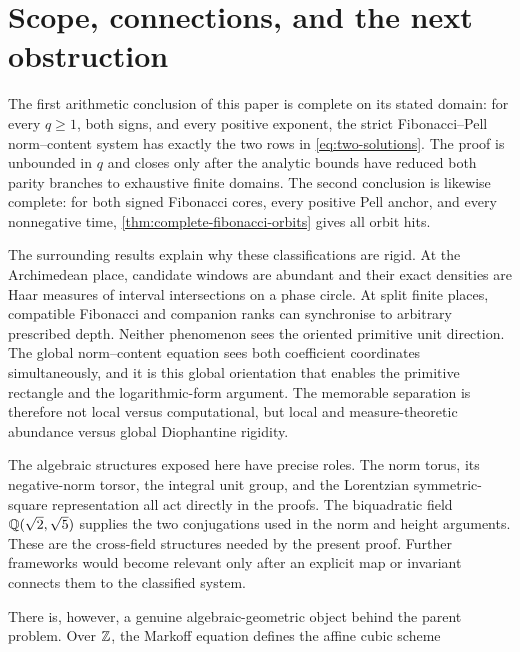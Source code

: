%
%
\section{Scope, connections, and the next obstruction}
\label{sec:outlook}

The first arithmetic conclusion of this paper is complete on its stated
domain: for every $q\geqslant1$, both signs, and every positive exponent,
the strict Fibonacci--Pell norm--content system has exactly the two rows in
\cref{eq:two-solutions}. The proof is unbounded in $q$ and closes only after
the analytic bounds have reduced both parity branches to exhaustive finite
domains. The second conclusion is likewise complete: for both signed
Fibonacci cores, every positive Pell anchor, and every nonnegative time,
\cref{thm:complete-fibonacci-orbits} gives all orbit hits.

The surrounding results explain why these classifications are rigid. At the
Archimedean place, candidate windows are abundant and their exact densities
are Haar measures of interval intersections on a phase circle. At split
finite places, compatible Fibonacci and companion ranks can synchronise to
arbitrary prescribed depth. Neither phenomenon sees the oriented primitive
unit direction. The global norm--content equation sees both coefficient
coordinates simultaneously, and it is this global orientation that enables
the primitive rectangle and the logarithmic-form argument. The memorable
separation is therefore not local versus computational, but local and
measure-theoretic abundance versus global Diophantine rigidity.

The algebraic structures exposed here have precise roles. The norm
torus, its negative-norm torsor, the integral unit group, and the Lorentzian
symmetric-square representation all act directly in the proofs. The
biquadratic field $\mathbb{Q}(\sqrt2,\sqrt5)$ supplies the two conjugations used in
the norm and height arguments. These are the cross-field structures needed
by the present proof. Further frameworks would become relevant only after an
explicit map or invariant connects them to the classified system.

There is, however, a genuine algebraic-geometric object behind the parent
problem. Over $\mathbb{Z}$, the Markoff equation defines the affine cubic scheme

